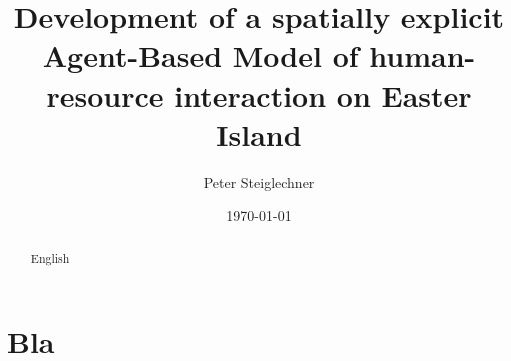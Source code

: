 \documentclass{kththesis}
\title{Development of a spatially explicit Agent-Based Model of human-resource interaction on Easter Island}
\author{Peter Steiglechner}
\date{\today}
\begin{document}
\frontmatter
%
\titlepage

\begin{abstract}
	English
\end{abstract}
\begin{otherlanguage}{swedish}
\end{otherlanguage}

\tableofcontents

\mainmatter
%

%








\printbibliography[heading=bibintoc]

\appendix
\chapter{Bla}
\tailmatter
\end{document}
